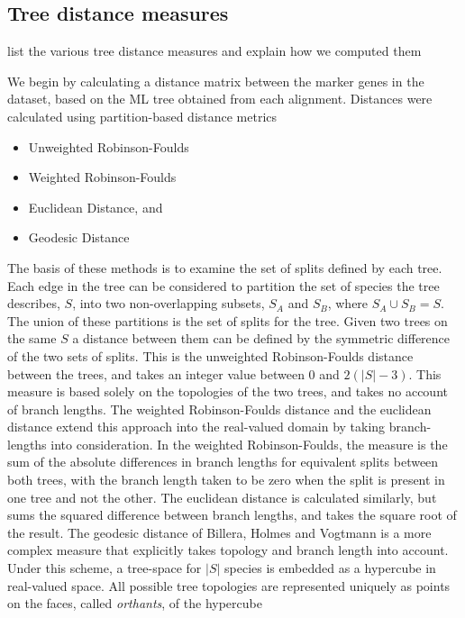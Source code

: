 \documentclass[10pt]{bmc_article}
\newenvironment{bmcformat}{\baselineskip20pt\sloppy\setboolean{publ}{false}}{\baselineskip20pt\sloppy}
\begin{document}
\begin{bmcformat}
  \subsection*{Tree distance measures}
  \begin{outline}
     \1 list the various tree distance measures and explain how we computed 
     them
  \end{outline}
We begin by calculating a distance matrix between the marker genes in the dataset, based on the ML tree obtained from each alignment. Distances were calculated using partition-based distance metrics \begin {itemize} 
\item Unweighted Robinson-Foulds 
\item Weighted Robinson-Foulds 
\item Euclidean Distance, and 
\item Geodesic Distance
\end{itemize}
The basis of these methods is to examine the set of splits defined by each tree. Each edge in the tree can be considered to partition the set of species the tree describes, $S$, into two non-overlapping subsets, $S_A$ and $S_B$, where $S_A \cup S_B = S$. The union of these partitions is the set of splits for the tree. Given two trees on the same $S$ a distance between them can be defined by the symmetric difference of the two sets of splits. This is the unweighted Robinson-Foulds distance between the trees, and takes an integer value between 0 and $2 \left( \left| {S} \right| - 3 \right)$. This measure is based solely on the topologies of the two trees, and takes no account of branch lengths. The weighted Robinson-Foulds distance and the euclidean distance extend this approach into the real-valued domain by taking branch-lengths into consideration. In the weighted Robinson-Foulds, the measure is the sum of the absolute differences in branch lengths for equivalent splits between both trees, with the branch length taken to be zero when the split is present in one tree and not the other. The euclidean distance is calculated similarly, but sums the squared difference between branch lengths, and takes the square root of the result. The geodesic distance of Billera, Holmes and Vogtmann is a more complex measure that explicitly takes topology and branch length into account. Under this scheme, a tree-space for $\left| {S} \right|$ species is embedded as a hypercube in real-valued space. All possible tree topologies are represented uniquely as points on the faces, called \textit{orthants}, of the hypercube

\end{bmcformat}
\end{document}
